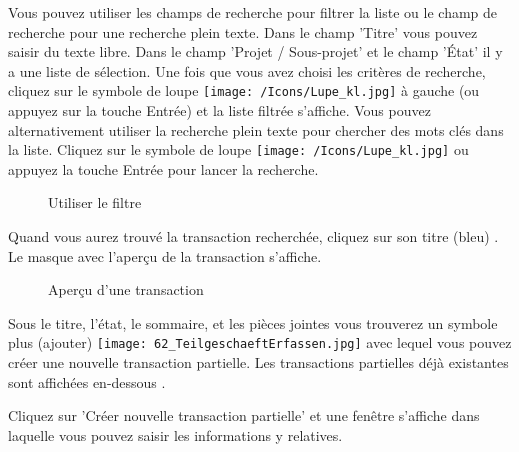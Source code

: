 Vous pouvez utiliser les champs de recherche pour filtrer la liste ou le champ de recherche  pour une recherche plein texte. Dans le champ 'Titre'  vous pouvez saisir du texte libre. Dans le champ 'Projet / Sous-projet'  et le champ 'État'  il y a une liste de sélection. Une fois que vous avez choisi les critères de recherche, cliquez sur le symbole de loupe \texttt{[image: /Icons/Lupe\_kl.jpg]}  à gauche (ou appuyez sur la touche Entrée) et la liste filtrée s'affiche. Vous pouvez alternativement utiliser la recherche plein texte pour chercher des mots clés dans la liste. Cliquez sur le symbole de loupe \texttt{[image: /Icons/Lupe\_kl.jpg]}  ou appuyez la touche Entrée pour lancer la recherche.

\begin{figure}[H]
\caption{Utiliser le filtre}
\end{figure}


Quand vous aurez trouvé la transaction recherchée, cliquez sur son titre (bleu) . Le masque avec l'aperçu de la transaction s'affiche.

\begin{figure}[H]
\caption{Aperçu d'une transaction}
\end{figure}

Sous le titre, l'état, le sommaire, et les pièces jointes vous trouverez un symbole plus (ajouter) \texttt{[image: 62\_TeilgeschaeftErfassen.jpg]}  avec lequel vous pouvez créer une nouvelle transaction partielle. Les transactions partielles déjà existantes sont affichées en-dessous .

\vspace{\baselineskip}

Cliquez sur 'Créer nouvelle transaction partielle' et une fenêtre s'affiche dans laquelle vous pouvez saisir les informations y relatives.

